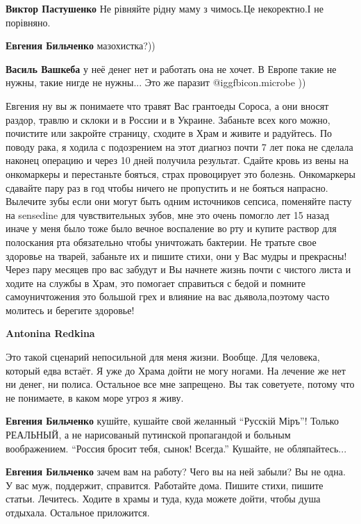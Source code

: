 \begin{itemize}
\begin{itemize}
\textbf{Виктор Пастушенко} Не рівняйте рідну маму з чимось.Це некоректно.І не порівняно.

\textbf{Евгения Бильченко} мазохистка?))

\textbf{Василь Вашкеба} у неё денег нет и работать она не хочет. В Европе такие не нужны, такие нигде не нужны...
Это же паразит  @igg{fbicon.microbe} ))
\end{itemize} %


Евгения ну вы ж понимаете что травят Вас грантоеды Сороса, а они вносят раздор,
травлю и склоки и в России и в Украине. Забаньте всех кого можно, почистите или
закройте страницу, сходите в Храм и живите и радуйтесь. По поводу рака, я
ходила с подозрением на этот диагноз почти 7 лет пока не сделала наконец
операцию и через 10 дней получила результат. Сдайте кровь из вены на
онкомаркеры и перестаньте бояться, страх провоцирует это болезнь. Онкомаркеры
сдавайте пару раз в год чтобы ничего не пропустить и не бояться напрасно.
Вылечите зубы если они могут быть одним источников сепсиса, поменяйте пасту на
sensedine для чувствительных зубов, мне это очень помогло лет 15 назад иначе у
меня было тоже было вечное воспаление во рту и купите раствор для полоскания
рта обязательно чтобы уничтожать бактерии. Не тратьте свое здоровье на тварей,
забаньте их и пишите стихи, они у Вас мудры и прекрасны! Через пару месяцев про
вас забудут и Вы начнете жизнь почти с чистого листа и ходите на службы в Храм,
это помогает справиться с бедой и помните самоуничтожения это большой грех и
влияние на вас дьявола,поэтому часто молитесь и берегите здоровье!

\begin{itemize} %
\textbf{Antonina Redkina} 

Это такой сценарий непосильной для меня жизни. Вообще. Для человека, который
едва встаёт. Я уже до Храма дойти не могу ногами. На лечение же нет ни денег,
ни полиса. Остальное все мне запрещено. Вы так советуете, потому что не
понимаете, в каком море угроз я живу.

\textbf{Евгения Бильченко} кушйте, кушайте свой желанный \enquote{Русскій Міръ}! Только РЕАЛЬНЫЙ, а не нарисованый путинской пропагандой и больным воображением. \enquote{Россия бросит тебя, сынок! Всегда.} Кушайте, не обляпайтесь...

\textbf{Евгения Бильченко} зачем вам на работу? Чего вы на ней забыли? Вы не одна. У вас муж, поддержит, справится. Работайте дома. Пишите стихи, пишите статьи. Лечитесь. Ходите в храмы и туда, куда можете дойти, чтобы душа отдыхала. Остальное приложится.
\end{itemize} %


\end{itemize}
